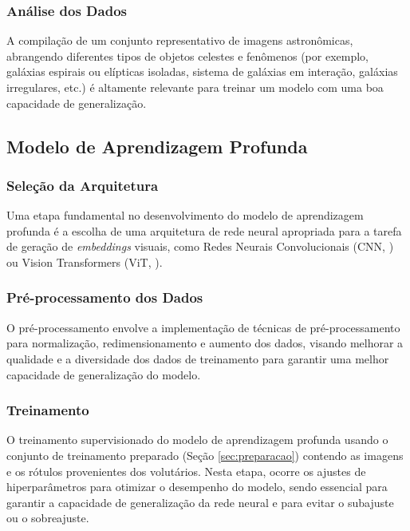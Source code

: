 \documentclass[a4,12pt]{horizon-theme}
\begin{document}
\subsubsection{Análise dos Dados}
A compilação de um conjunto representativo de imagens astronômicas, abrangendo diferentes tipos de objetos celestes e fenômenos (por exemplo, galáxias espirais ou elípticas isoladas, sistema de galáxias em interação, galáxias irregulares, etc.) é altamente relevante para treinar um modelo com uma boa capacidade de generalização. %





\subsection{Modelo de Aprendizagem Profunda}
\label{sec:modelo}
\subsubsection{Seleção da Arquitetura}
Uma etapa fundamental no desenvolvimento do modelo de aprendizagem profunda é a escolha de uma arquitetura de rede neural apropriada para a tarefa de geração de \emph{embeddings} visuais, como Redes Neurais Convolucionais (CNN, \cite{cnn}) ou Vision Transformers (ViT, \cite{ViT}).

\subsubsection{Pré-processamento dos Dados}
O pré-processamento envolve a implementação de técnicas de pré-processamento para normalização, redimensionamento e aumento dos dados, visando melhorar a qualidade e a diversidade dos dados de treinamento para garantir uma melhor capacidade de generalização do modelo.

\subsubsection{Treinamento}
\label{sec:treinamento}
O treinamento supervisionado do modelo de aprendizagem profunda usando o conjunto de treinamento preparado (Seção \ref{sec:preparacao}) contendo as imagens e os rótulos provenientes dos volutários. Nesta etapa, ocorre os ajustes de hiperparâmetros para otimizar o desempenho do modelo, sendo essencial para garantir a capacidade de generalização da rede neural e para evitar o subajuste ou o sobreajuste.
\end{document}
